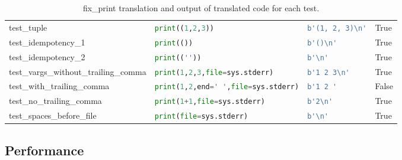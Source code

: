\begin{table*}[ht]
\begin{tabular}{@{}l|lll@{}}
    test\_tuple                           & \lstinline[language=Python, style=pythonstyle]|print((1,2,3))                    | & \lstinline[language=Python, style=pythonstyle]|b'(1, 2, 3)\n'| & True                      \\
    test\_idempotency\_1                  & \lstinline[language=Python, style=pythonstyle]|print(())                         | & \lstinline[language=Python, style=pythonstyle]|b'()\n'       | & True                      \\
    test\_idempotency\_2                  & \lstinline[language=Python, style=pythonstyle]|print((''))                       | & \lstinline[language=Python, style=pythonstyle]|b'\n'         | & True                      \\
    test\_vargs\_without\_trailing\_comma & \lstinline[language=Python, style=pythonstyle]|print(1,2,3,file=sys.stderr)      | & \lstinline[language=Python, style=pythonstyle]|b'1 2 3\n'    | & True                      \\
    test\_with\_trailing\_comma           & \lstinline[language=Python, style=pythonstyle]|print(1,2,end=' ',file=sys.stderr)| & \lstinline[language=Python, style=pythonstyle]|b'1 2 '       |                & False                     \\
    test\_no\_trailing\_comma             & \lstinline[language=Python, style=pythonstyle]|print(1+1,file=sys.stderr)        | & \lstinline[language=Python, style=pythonstyle]|b'2\n'        | & True                      \\
    test\_spaces\_before\_file            & \lstinline[language=Python, style=pythonstyle]|print(file=sys.stderr)            | & \lstinline[language=Python, style=pythonstyle]|b'\n'         | & True                      \\ \bottomrule
    \end{tabular}
    \caption{fix\_print translation and output of translated code for each test.}
    \label{table:fix_print-accuracy}
\end{table*}

\subsection{Performance}

